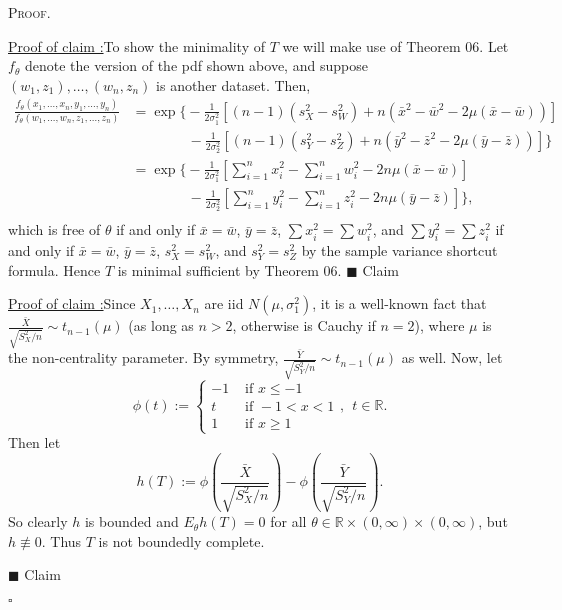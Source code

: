 \documentclass[12pt]{article}
\newcounter{ProofCounter}
\newcounter{ClaimCounter}[ProofCounter]
\newenvironment{Proof}{\stepcounter{ProofCounter}\textsc{Proof.}}{\hfill$\square$}
\newenvironment{claim}[1]{\vspace{1mm}\stepcounter{ClaimCounter}\par\noindent\underline{\bf Claim \theClaimCounter:}\space#1}{}
\newenvironment{claimproof}[1]{\par\noindent\underline{Proof of claim \theClaimCounter:}\space#1}{\hfill $\blacksquare$ Claim \theClaimCounter}
\begin{document}
\begin{Proof}
  \begin{claimproof}
    To show the minimality of $T$ we will make use of Theorem 06. Let $f_{\theta}$ denote the
    version of the pdf shown above, and suppose
    $(w_1, z_1), \dots, (w_n, z_n)$ is another dataset. Then,
    \begin{align*}
      \frac{f_{\theta}(x_1, \dots, x_n, y_1, \dots, y_n)}{ f_{\theta}(w_1, \dots, w_n, z_1, \dots, z_n)} & =
      \exp\bigg\{ -\frac{1}{2\sigma_{1}^{2}}\left[ (n-1)(s_{X}^{2} - s_{W}^{2}) + n(\bar{x}^{2} - \bar{w}^{2} - 2\mu(\bar{x} - \bar{w})) \right] \\
        & \qquad \qquad - \frac{1}{2\sigma_{2}^{2}}\left[ (n-1)(s_{Y}^{2} - s_{Z}^{2}) + n(\bar{y}^{2} - \bar{z}^{2} - 2\mu(\bar{y} - \bar{z}))
      \right]\bigg\} \\
      & = \exp\bigg\{ -\frac{1}{2\sigma_{1}^{2}}\left[ \sum_{i=1}^{n}x_{i}^{2}-\sum_{i=1}^{n}w_{i}^{2} - 2n\mu(\bar{x} - \bar{w}) \right] \\
        & \qquad \qquad - \frac{1}{2\sigma_{2}^{2}}\left[ \sum_{i=1}^{n}y_{i}^{2}-\sum_{i=1}^{n}z_{i}^{2} - 2n\mu(\bar{y} - \bar{z})
      \right]\bigg\}, \\
    \end{align*}
    which is free of $\theta$ if and only if $\bar{x} = \bar{w}$, $\bar{y} = \bar{z}$, $\sum x_{i}^{2} = \sum w_{i}^{2}$, and $\sum y_{i}^{2} = \sum
    z_{i}^{2}$ if and only if $\bar{x} = \bar{w}$, $\bar{y} = \bar{z}$, $s_{X}^{2} = s_{W}^{2}$, and $s_{Y}^{2} = s_{Z}^{2}$ by the sample variance
    shortcut formula. Hence $T$ is minimal sufficient by Theorem 06.
  \end{claimproof}

  \begin{claimproof}
    Since $X_{1},\dots, X_{n}$ are iid $N(\mu, \sigma_{1}^{2})$, it is a well-known fact that $\frac{\bar{X}}{\sqrt{S_{X}^{2} / n}} \sim
    t_{n-1}(\mu)$ (as long as $n > 2$, otherwise is Cauchy if $n = 2$), where $\mu$ is the non-centrality parameter. By symmetry, $\frac{\bar{Y}}{\sqrt{S_{Y}^{2} / n}} \sim t_{n-1}(\mu)$ as well.
    Now, let 
    \[
      \phi(t) := \left\{ \begin{array}{cl}
          -1 & \text{ if } x \leq -1 \\
          t & \text{ if } -1 < x < 1 \\
          1 & \text{ if } x \geq 1
      \end{array} \right., \ \ t \in \mathbb{R}.
    \]
    Then let 
    \[
      h(T) := \phi\left( \frac{\bar{X}}{\sqrt{S_{X}^{2} / n}} \right) - \phi\left( \frac{\bar{Y}}{\sqrt{S_{Y}^{2}/n}} \right).
    \]
    So clearly $h$ is bounded and $E_{\theta}h(T) = 0$ for all $\theta \in \mathbb{R} \times (0,\infty) \times (0,\infty)$, but $h \not\equiv 0$. Thus $T$ is not boundedly complete.

  \end{claimproof}

\end{Proof}
\end{document}
